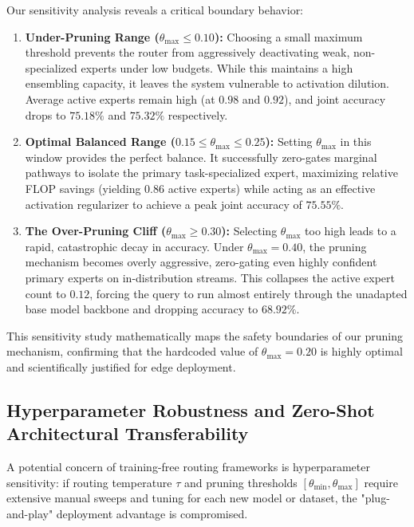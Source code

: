 \documentclass{article}
\theoremstyle{plain}
\theoremstyle{definition}
\theoremstyle{remark}
\begin{document}
Our sensitivity analysis reveals a critical boundary behavior:
\begin{enumerate}
    \item \textbf{Under-Pruning Range ($\theta_{\max} \le 0.10$):} Choosing a small maximum threshold prevents the router from aggressively deactivating weak, non-specialized experts under low budgets. While this maintains a high ensembling capacity, it leaves the system vulnerable to activation dilution. Average active experts remain high (at $0.98$ and $0.92$), and joint accuracy drops to $75.18\%$ and $75.32\%$ respectively.
    \item \textbf{Optimal Balanced Range ($0.15 \le \theta_{\max} \le 0.25$):} Setting $\theta_{\max}$ in this window provides the perfect balance. It successfully zero-gates marginal pathways to isolate the primary task-specialized expert, maximizing relative FLOP savings (yielding $0.86$ active experts) while acting as an effective activation regularizer to achieve a peak joint accuracy of $75.55\%$.
    \item \textbf{The Over-Pruning Cliff ($\theta_{\max} \ge 0.30$):} Selecting $\theta_{\max}$ too high leads to a rapid, catastrophic decay in accuracy. Under $\theta_{\max} = 0.40$, the pruning mechanism becomes overly aggressive, zero-gating even highly confident primary experts on in-distribution streams. This collapses the active expert count to $0.12$, forcing the query to run almost entirely through the unadapted base model backbone and dropping accuracy to $68.92\%$.
\end{enumerate}
This sensitivity study mathematically maps the safety boundaries of our pruning mechanism, confirming that the hardcoded value of $\theta_{\max} = 0.20$ is highly optimal and scientifically justified for edge deployment.

\subsection{Hyperparameter Robustness and Zero-Shot Architectural Transferability}
A potential concern of training-free routing frameworks is hyperparameter sensitivity: if routing temperature $\tau$ and pruning thresholds $[\theta_{\min}, \theta_{\max}]$ require extensive manual sweeps and tuning for each new model or dataset, the "plug-and-play" deployment advantage is compromised. 
\end{document}
